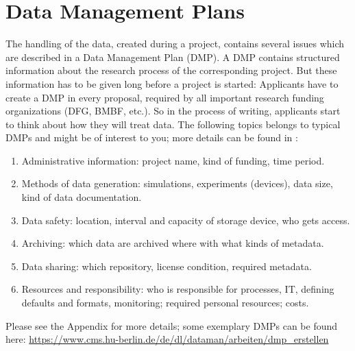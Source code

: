 \section{Data Management Plans}

The handling of the data, created during a project, contains several issues
which are described in a Data Management Plan (DMP). A DMP contains structured
information about the research process of the corresponding project. But these
information has to be given long before a project is started: Applicants have
to create a DMP in every proposal, required by all important research funding
organizations (DFG, BMBF, etc.). So in the process of writing, applicants start
to think about how they will treat data. The following topics belongs to typical
DMPs and might be of interest to you; more details can be found in
\cite{dfg2021,hannover2020}:
\begin{enumerate}
  \item Administrative information: project name, kind of funding, time period.
  \item Methods of data generation: simulations, experiments (devices),
        data size, kind of data documentation.
  \item Data safety: location, interval and capacity of storage device,
        who gets access.
  \item Archiving: which data are archived where with what kinds of metadata.
  \item Data sharing: which repository, license condition, required metadata.
  \item Resources and responsibility: who is responsible for processes, IT,
        defining defaults and formats, monitoring; required personal resources;
        costs.
\end{enumerate}
Please see the Appendix for more details; some exemplary DMPs can be found here:
\url{https://www.cms.hu-berlin.de/de/dl/dataman/arbeiten/dmp_erstellen}
